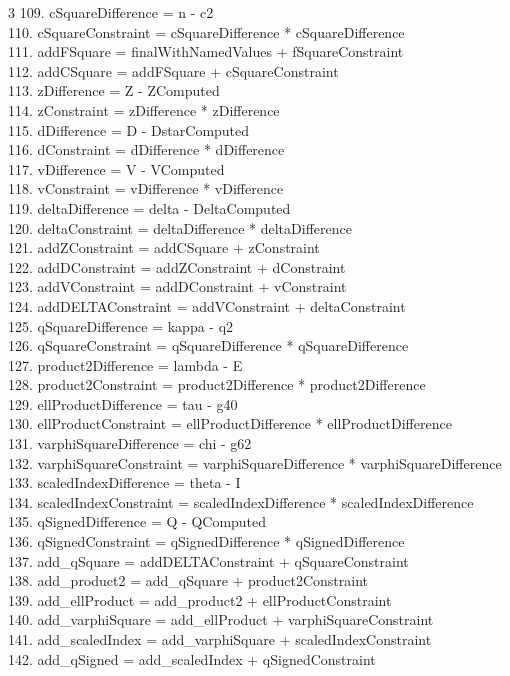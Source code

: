 \documentclass[10pt]{article}
\begin{document}
\begin{multicols}{3}
109. cSquareDifference = n - c2\\
110. cSquareConstraint = cSquareDifference * cSquareDifference\\
111. addFSquare = finalWithNamedValues + fSquareConstraint\\
112. addCSquare = addFSquare + cSquareConstraint\\
113. zDifference = Z - ZComputed\\
114. zConstraint = zDifference * zDifference\\
115. dDifference = D - DstarComputed\\
116. dConstraint = dDifference * dDifference\\
117. vDifference = V - VComputed\\
118. vConstraint = vDifference * vDifference\\
119. deltaDifference = delta - DeltaComputed\\
120. deltaConstraint = deltaDifference * deltaDifference\\
121. addZConstraint = addCSquare + zConstraint\\
122. addDConstraint = addZConstraint + dConstraint\\
123. addVConstraint = addDConstraint + vConstraint\\
124. addDELTAConstraint = addVConstraint + deltaConstraint\\
125. qSquareDifference = kappa - q2\\
126. qSquareConstraint = qSquareDifference * qSquareDifference\\
127. product2Difference = lambda - E\\
128. product2Constraint = product2Difference * product2Difference\\
129. ellProductDifference = tau - g40\\
130. ellProductConstraint = ellProductDifference * ellProductDifference\\
131. varphiSquareDifference = chi - g62\\
132. varphiSquareConstraint = varphiSquareDifference * varphiSquareDifference\\
133. scaledIndexDifference = theta - I\\
134. scaledIndexConstraint = scaledIndexDifference * scaledIndexDifference\\
135. qSignedDifference = Q - QComputed\\
136. qSignedConstraint = qSignedDifference * qSignedDifference\\
137. add\_qSquare = addDELTAConstraint + qSquareConstraint\\
138. add\_product2 = add\_qSquare + product2Constraint\\
139. add\_ellProduct = add\_product2 + ellProductConstraint\\
140. add\_varphiSquare = add\_ellProduct + varphiSquareConstraint\\
141. add\_scaledIndex = add\_varphiSquare + scaledIndexConstraint\\
142. add\_qSigned = add\_scaledIndex + qSignedConstraint\\
\end{multicols}
\end{document}
